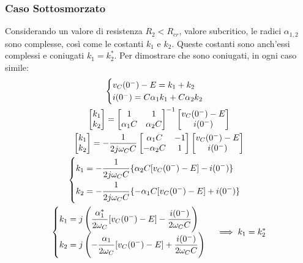 \documentclass{article}
\numberwithin{equation}{subsection}
\begin{document}
\subsubsection{Caso Sottosmorzato}
Considerando un valore di resistenza $R_2<R_{cr}$, valore subcritico, le radici $\alpha_{1,2}$ sono complesse, così come le costanti $k_1$ e $k_2$. Queste costanti sono anch'essi 
complessi e coniugati $k_1=k_2^*$. Per dimostrare che sono coniugati, in ogni caso simile:
\begin{gather*}
    \begin{cases}
        v_C(0^-)-E=k_1+k_2\\
        i(0^-)=C\alpha_1k_1+C\alpha_2k_2
    \end{cases}\\
    \begin{bmatrix}
        k_1\\k_2
    \end{bmatrix}=
    \begin{bmatrix}
        1&1\\\alpha_1C&\alpha_2C 
    \end{bmatrix}^{-1}
    \begin{bmatrix}
        v_C(0^-)-E\\i(0^-)
    \end{bmatrix}\\
    \begin{bmatrix}
        k_1\\k_2
    \end{bmatrix}=\displaystyle-\frac{1}{2j\omega_CC}
    \begin{bmatrix}
        \alpha_1C&-1\\-\alpha_2C&1
    \end{bmatrix}
    \begin{bmatrix}
        v_C(0^-)-E\\i(0^-)
    \end{bmatrix}\\
    \begin{cases}
        k_1=\displaystyle-\frac{\strut 1}{\strut 2j\omega_C C}\{\alpha_2C[v_C(0^-)-E]-i(0^-)\}\\
        k_2=\displaystyle-\frac{\strut 1}{\strut 2j\omega_C C}\{-\alpha_1C[v_C(0^-)-E]+i(0^-)\}
    \end{cases}\\
    \begin{cases}
        k_1=j\left(\displaystyle\frac{\strut \alpha_1^*}{\strut 2\omega_C}[v_C(0^-)-E]-\frac{i(0^-)}{2\omega_CC}\right)\\
        k_2=j\left(\displaystyle-\frac{\strut \alpha_1}{\strut 2\omega_C}[v_C(0^-)-E]+\frac{i(0^-)}{2\omega_CC}\right)
    \end{cases}\implies k_1=k_2^*
\end{gather*}
\end{document}
